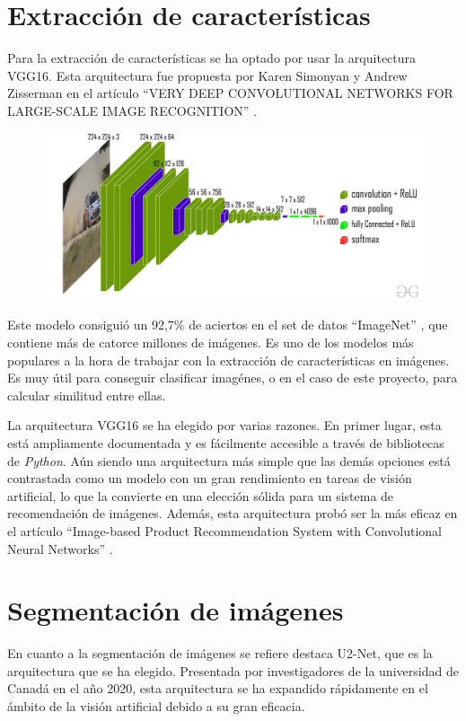 \documentclass[12pt]{report} %
\begin{document}
	\section{Extracción de características}
	Para la extracción de características se ha optado por usar la arquitectura VGG16. Esta arquitectura fue propuesta por
	Karen Simonyan y Andrew Zisserman en el artículo ``VERY DEEP CONVOLUTIONAL NETWORKS FOR LARGE-SCALE IMAGE RECOGNITION'' \cite{vgg16-paper}.
	\begin{figure}[H]
		{\includegraphics[scale=0.3]{vgg-funcionamiento.jpg}}
	\end{figure}

	Este modelo consiguió un 92,7\% de aciertos en el set de datos ``ImageNet'' \cite{imageNet}, que contiene más de catorce millones de imágenes.
	Es uno de los modelos más populares a la hora de trabajar con la extracción de características en imágenes. Es muy útil para
	conseguir clasificar imagénes, o en el caso de este proyecto, para calcular similitud entre ellas.

	La arquitectura VGG16 se ha elegido por varias razones. En primer lugar, esta está ampliamente documentada y es fácilmente accesible
	a través de bibliotecas de \textit{Python}. Aún siendo una arquitectura más simple que las demás opciones está contrastada como
	un modelo con un gran rendimiento en tareas de visión artificial, lo que la convierte en una elección sólida para un sistema de recomendación
	de imágenes. Además, esta arquitectura probó ser la más eficaz en el artículo ``Image-based Product Recommendation System with Convolutional Neural
	Networks'' \cite{stanford-paper}.

	\section{Segmentación de imágenes}
	En cuanto a la segmentación de imágenes se refiere destaca U2-Net, que es la arquitectura que se ha elegido.
	Presentada por investigadores de la universidad de Canadá en el año 2020, esta arquitectura se ha expandido
	rápidamente en el ámbito de la visión artificial debido a su gran eficacia.
\end{document}

